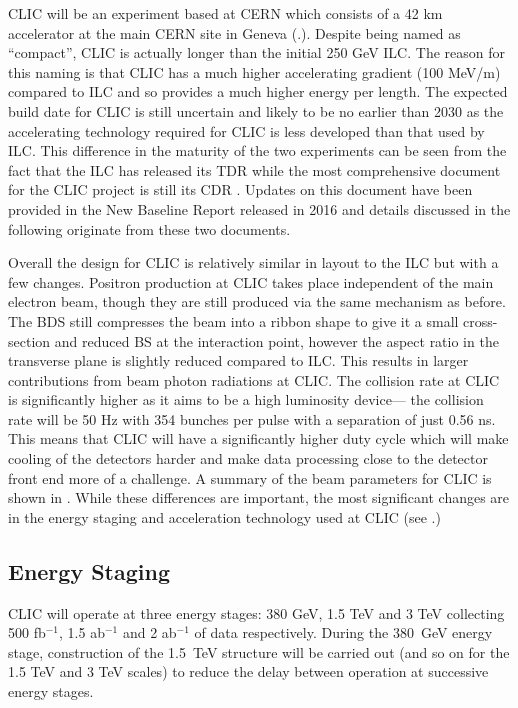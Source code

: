 \ac{CLIC} will be an experiment based at CERN which consists of a 42 km accelerator at the main CERN site in Geneva (.). Despite being named as “compact”, \ac{CLIC} is actually longer than the initial 250 GeV \ac{ILC}. The reason for this naming is that \ac{CLIC} has a much higher accelerating gradient (100 MeV/m) compared to ILC and so provides a much higher energy per length. The expected build date for \ac{CLIC} is still uncertain and likely to be no earlier than 2030 as the accelerating technology required for \ac{CLIC} is less developed than that used by \ac{ILC}. This difference in the maturity of the two experiments can be seen from the fact that the \ac{ILC} has released its \ac{TDR} while the most comprehensive document for the CLIC project is still its \ac{CDR} \cite{CDR}. Updates on this document have been provided in the New Baseline Report \cite{CLIC:2016zwp} released in 2016 and details discussed in the following originate from these two documents. 

Overall the design for \ac{CLIC} is relatively similar in layout to the \ac{ILC} but with a few changes. Positron production at \ac{CLIC} takes place independent of the main electron beam, though they are still produced via the same mechanism as before. The \ac{BDS} still compresses the beam into a ribbon shape to give it a small cross-section and reduced \ac{BS} at the interaction point, however the aspect ratio in the transverse plane is slightly reduced compared to \ac{ILC}. This results in larger contributions from beam photon radiations at \ac{CLIC}. The collision rate at \ac{CLIC} is significantly higher as it aims to be a high luminosity device--- the collision rate will be 50 Hz with 354 bunches per pulse with a separation of just 0.56 ns. This means that CLIC will have a significantly higher duty cycle which will make cooling of the detectors harder and make data processing close to the detector front end more of a challenge. A summary of the beam parameters for CLIC is shown in . While these differences are important, the most significant changes are in the energy staging and acceleration technology used at \ac{CLIC} (see .)

\subsection{Energy Staging}

CLIC will operate at three energy stages: 380 GeV, 1.5 TeV and 3 TeV collecting 500 fb${^{-1}}$, 1.5 ab${^{-1}}$ and 2 ab${^{-1}}$ of data respectively. During the 380~GeV energy stage, construction of the 1.5~TeV structure will be carried out (and so on for the 1.5 TeV and 3 TeV scales) to reduce the delay between operation at successive energy stages. 

